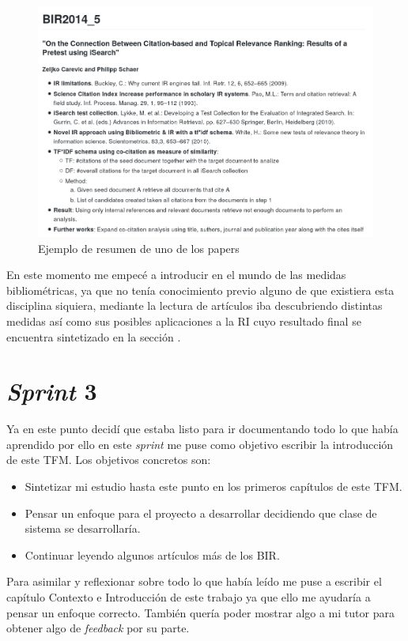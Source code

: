 \begin{figure}[h!]
	
	\centering
	\includegraphics[width=\linewidth]{imagenes/paper_sumary}
	\caption{Ejemplo de resumen de uno de los papers}
\end{figure}

En este momento me empecé a introducir en el mundo de las medidas bibliométricas, ya que no tenía conocimiento previo alguno de que existiera esta disciplina siquiera, mediante la lectura de artículos iba descubriendo distintas medidas así como sus posibles aplicaciones a la \acrshort{RI} cuyo resultado final se encuentra sintetizado en la sección .

\section{\textit{Sprint} 3}
Ya en este punto decidí que estaba listo para ir documentando todo lo que había aprendido por ello en este \textit{sprint} me puse como objetivo escribir la introducción de este \acrshort{TFM}. Los objetivos concretos son:
\begin{itemize}
	\item Sintetizar mi estudio hasta este punto en los primeros capítulos de este \acrshort{TFM}.
	\item Pensar un enfoque para el proyecto a desarrollar decidiendo que clase de sistema se desarrollaría.
	\item Continuar leyendo algunos artículos más de los \acrshort{BIR}.
\end{itemize}

Para asimilar y reflexionar sobre todo lo que había leído me puse a escribir el capítulo Contexto e Introducción de este trabajo ya que ello me ayudaría a pensar un enfoque correcto. También quería poder mostrar algo a mi tutor para obtener algo de \textit{feedback} por su parte.

